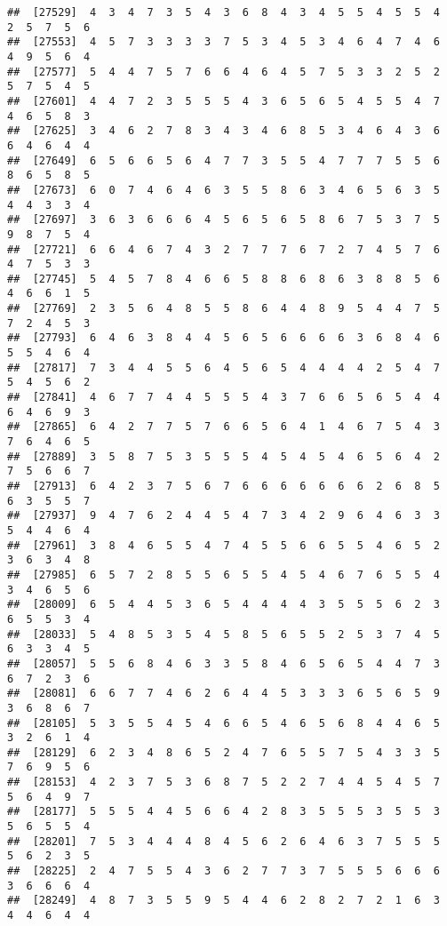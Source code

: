 \documentclass[
]{book}
\begin{document}
\begin{verbatim}
##  [27529]  4  3  4  7  3  5  4  3  6  8  4  3  4  5  5  4  5  5  4  2  5  7  5  6
##  [27553]  4  5  7  3  3  3  3  7  5  3  4  5  3  4  6  4  7  4  6  4  9  5  6  4
##  [27577]  5  4  4  7  5  7  6  6  4  6  4  5  7  5  3  3  2  5  2  5  7  5  4  5
##  [27601]  4  4  7  2  3  5  5  5  4  3  6  5  6  5  4  5  5  4  7  4  6  5  8  3
##  [27625]  3  4  6  2  7  8  3  4  3  4  6  8  5  3  4  6  4  3  6  6  4  6  4  4
##  [27649]  6  5  6  6  5  6  4  7  7  3  5  5  4  7  7  7  5  5  6  8  6  5  8  5
##  [27673]  6  0  7  4  6  4  6  3  5  5  8  6  3  4  6  5  6  3  5  4  4  3  3  4
##  [27697]  3  6  3  6  6  6  4  5  6  5  6  5  8  6  7  5  3  7  5  9  8  7  5  4
##  [27721]  6  6  4  6  7  4  3  2  7  7  7  6  7  2  7  4  5  7  6  4  7  5  3  3
##  [27745]  5  4  5  7  8  4  6  6  5  8  8  6  8  6  3  8  8  5  6  4  6  6  1  5
##  [27769]  2  3  5  6  4  8  5  5  8  6  4  4  8  9  5  4  4  7  5  7  2  4  5  3
##  [27793]  6  4  6  3  8  4  4  5  6  5  6  6  6  6  3  6  8  4  6  5  5  4  6  4
##  [27817]  7  3  4  4  5  5  6  4  5  6  5  4  4  4  4  2  5  4  7  5  4  5  6  2
##  [27841]  4  6  7  7  4  4  5  5  5  4  3  7  6  6  5  6  5  4  4  6  4  6  9  3
##  [27865]  6  4  2  7  7  5  7  6  6  5  6  4  1  4  6  7  5  4  3  7  6  4  6  5
##  [27889]  3  5  8  7  5  3  5  5  5  4  5  4  5  4  6  5  6  4  2  7  5  6  6  7
##  [27913]  6  4  2  3  7  5  6  7  6  6  6  6  6  6  6  2  6  8  5  6  3  5  5  7
##  [27937]  9  4  7  6  2  4  4  5  4  7  3  4  2  9  6  4  6  3  3  5  4  4  6  4
##  [27961]  3  8  4  6  5  5  4  7  4  5  5  6  6  5  5  4  6  5  2  3  6  3  4  8
##  [27985]  6  5  7  2  8  5  5  6  5  5  4  5  4  6  7  6  5  5  4  3  4  6  5  6
##  [28009]  6  5  4  4  5  3  6  5  4  4  4  4  3  5  5  5  6  2  3  6  5  5  3  4
##  [28033]  5  4  8  5  3  5  4  5  8  5  6  5  5  2  5  3  7  4  5  6  3  3  4  5
##  [28057]  5  5  6  8  4  6  3  3  5  8  4  6  5  6  5  4  4  7  3  6  7  2  3  6
##  [28081]  6  6  7  7  4  6  2  6  4  4  5  3  3  3  6  5  6  5  9  3  6  8  6  7
##  [28105]  5  3  5  5  4  5  4  6  6  5  4  6  5  6  8  4  4  6  5  3  2  6  1  4
##  [28129]  6  2  3  4  8  6  5  2  4  7  6  5  5  7  5  4  3  3  5  7  6  9  5  6
##  [28153]  4  2  3  7  5  3  6  8  7  5  2  2  7  4  4  5  4  5  7  5  6  4  9  7
##  [28177]  5  5  5  4  4  5  6  6  4  2  8  3  5  5  5  3  5  5  3  5  6  5  5  4
##  [28201]  7  5  3  4  4  4  8  4  5  6  2  6  4  6  3  7  5  5  5  5  6  2  3  5
##  [28225]  2  4  7  5  5  4  3  6  2  7  7  3  7  5  5  5  6  6  6  3  6  6  6  4
##  [28249]  4  8  7  3  5  5  9  5  4  4  6  2  8  2  7  2  1  6  3  4  4  6  4  4

\end{verbatim}
\end{document}
